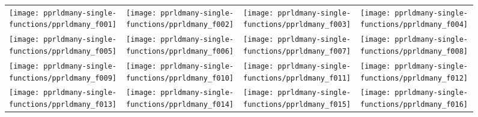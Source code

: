 \documentclass{sig-alternate}
\begin{document}
\begin{figure*}
\centering
\begin{tabular}{@{\hspace*{-0.018\textwidth}}l@{\hspace*{-0.02\textwidth}}l@{\hspace*{-0.02\textwidth}}l@{\hspace*{-0.02\textwidth}}l@{\hspace*{-0.02\textwidth}}}
\texttt{[image: pprldmany-single-functions/pprldmany\_f001]}&
\texttt{[image: pprldmany-single-functions/pprldmany\_f002]}&
\texttt{[image: pprldmany-single-functions/pprldmany\_f003]}&
\texttt{[image: pprldmany-single-functions/pprldmany\_f004]}\\[-1.8ex]
\texttt{[image: pprldmany-single-functions/pprldmany\_f005]}&
\texttt{[image: pprldmany-single-functions/pprldmany\_f006]}&
\texttt{[image: pprldmany-single-functions/pprldmany\_f007]}&
\texttt{[image: pprldmany-single-functions/pprldmany\_f008]}\\[-1.8ex]
\texttt{[image: pprldmany-single-functions/pprldmany\_f009]}&
\texttt{[image: pprldmany-single-functions/pprldmany\_f010]}&
\texttt{[image: pprldmany-single-functions/pprldmany\_f011]}&
\texttt{[image: pprldmany-single-functions/pprldmany\_f012]}\\[-1.8ex]
\texttt{[image: pprldmany-single-functions/pprldmany\_f013]}&
\texttt{[image: pprldmany-single-functions/pprldmany\_f014]}&
\texttt{[image: pprldmany-single-functions/pprldmany\_f015]}&
\texttt{[image: pprldmany-single-functions/pprldmany\_f016]}\\[-1.8ex]
\end{tabular}
 \caption{\label{fig:ECDFsingleOne}
 \bbobecdfcaptionsinglefcts{}
}


\end{figure*}
\end{document}
